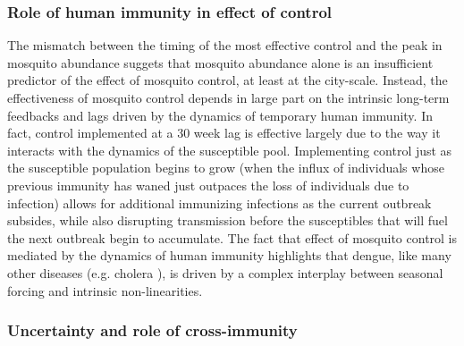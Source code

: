 \documentclass[10pt,letterpaper]{article}
\begin{document}
\subsubsection{Role of human immunity in effect of control}

The mismatch between the timing of the most effective control and the peak in mosquito abundance suggets that mosquito abundance alone is an insufficient predictor of the effect of mosquito control, at least at the city-scale.
Instead, the effectiveness of mosquito control depends in large part on the intrinsic long-term feedbacks and lags driven by the dynamics of temporary human immunity.
In fact, control implemented at a 30 week lag is effective largely due to the way it interacts with the dynamics of the susceptible pool. 
Implementing control just as the susceptible population begins to grow (when the influx of individuals whose previous immunity has waned just outpaces the loss of individuals due to infection) allows for additional immunizing infections as the current outbreak subsides, while also disrupting transmission before the susceptibles that will fuel the next outbreak begin to accumulate.
The fact that effect of mosquito control is mediated by the dynamics of human immunity highlights that dengue, like many other diseases (e.g. cholera \cite{Koelle2004, Koelle2005}), is driven by a complex interplay between seasonal forcing and intrinsic non-linearities.

\subsubsection{Uncertainty and role of cross-immunity}
\end{document}
